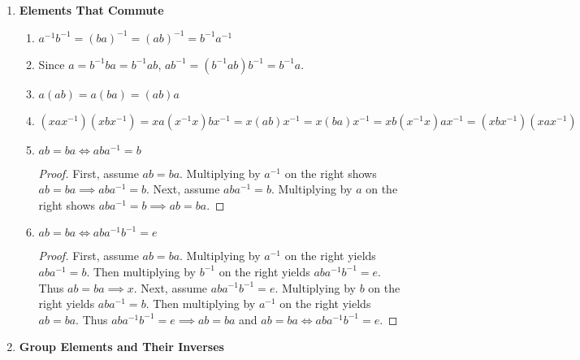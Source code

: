 \begin{enumerate}[label={\Alph*.},font={\bfseries}]
\begin{enumerate}[label={\arabic*},font={\bfseries}]
    As shown in the table, there does not exist an $x \in G$ such that $x = y^2$ for $y \in \Set{\mathbf{A}, \mathbf{C}, \mathbf{K}}$. \\
    Therefore $\neg\left(\forall x \in G,\ \exists y \in G\left( x = y^2 \right)\right)$.\qed
  \item
    \begin{align*}
      y &= xz \\
      x^{-1}y &= x^{-1}xz \\
      z &= x^{-1}y
    \end{align*}
    Therefore, for all $x,y \in G$, there exists a $z \in G$ such that $y = xz$.\qed
  \end{enumerate}
\newpage
\item {\bf Elements That Commute}
  \begin{enumerate}[label={\arabic*},font={\bfseries}]
  \item $a^{-1}b^{-1} = (ba)^{-1} = (ab)^{-1} = b^{-1}a^{-1}$
  \item Since $a = b^{-1}ba = b^{-1}ab$, $ab^{-1} = (b^{-1}ab)b^{-1} = b^{-1}a$.
  \item $a(ab) = a(ba) = (ab)a$
  \item $(xax^{-1})(xbx^{-1}) = xa(x^{-1}x)bx^{-1} = x(ab)x^{-1} = x(ba)x^{-1} = xb(x^{-1}x)ax^{-1} = (xbx^{-1})(xax^{-1})$
  \item $ab = ba \iff aba^{-1} = b$
    \begin{proof}
      First, assume $ab = ba$.
      Multiplying by $a^{-1}$ on the right shows $ab = ba \implies aba^{-1} = b$.
      Next, assume $aba^{-1} = b$.
      Multiplying by $a$ on the right shows $aba^{-1} = b \implies ab = ba$.
    \end{proof}
  \item $ab = ba \iff aba^{-1}b^{-1} = e$
    \begin{proof}
      First, assume $ab = ba$.
      Multiplying by $a^{-1}$ on the right yields $aba^{-1} = b$.
      Then multiplying by $b^{-1}$ on the right yields $aba^{-1}b^{-1} = e$.
      Thus $ab = ba \implies x$.
      Next, assume $aba^{-1}b^{-1} = e$.
      Multiplying by $b$ on the right yields $aba^{-1} = b$.
      Then multiplying by $a^{-1}$ on the right yields $ab = ba$.
      Thus $aba^{-1}b^{-1} = e \implies ab = ba$ and $ab = ba \iff aba^{-1}b^{-1} = e$.
    \end{proof}
  \end{enumerate}
\item {\bf Group Elements and Their Inverses}
  \begin{enumerate}[label={\arabic*},font={\bfseries}]

\end{enumerate}
\end{enumerate}
